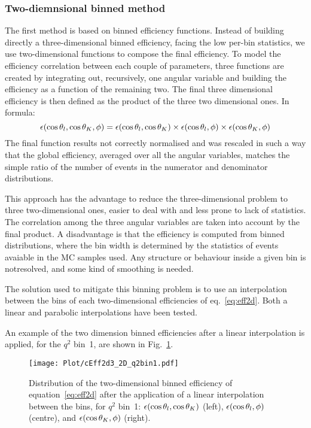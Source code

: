 \subsubsection{Two-diemnsional binned method}\label{sec:eff_2Dprod}
The first method is based on binned efficiency functions.
Instead of building directly a three-dimensional binned efficiency, facing the low per-bin statistics, we use two-dimensional functions to compose the final efficiency.
To model the efficiency correlation between each couple of parameters, three functions are created by integrating out, recursively, one angular variable and building the efficiency as a function of the remaining two.
The final three dimensional efficiency is then defined as the product of the three two dimensional ones.
In formula:
\begin{equation}\label{eq:eff2d}
    \epsilon(\cos\theta_l,\cos\theta_K,\phi)=\epsilon(\cos\theta_l,\cos\theta_K)\times\epsilon(\cos\theta_l,\phi)\times\epsilon(\cos\theta_K,\phi)
\end{equation}
The final function results not correctly normalised and was rescaled in such a way that the global efficiency, averaged over all the angular variables, matches the simple ratio of the number of events in the numerator and denominator distributions.

This approach has the advantage to reduce the three-dimensional problem to three two-dimensional ones, easier to deal with and less prone to lack of statistics.
The correlation among the three angular variables are taken into account by the final product.
A disadvantage is that the efficiency is computed from binned distributions, where the bin width is determined by the statistics of events avaiable in the MC samples used.
Any structure or behaviour inside a given bin is notresolved, and some kind of smoothing is needed.

The solution used to mitigate this binning problem is to use an interpolation between the bins of each two-dimensional efficiencies of eq.~\ref{eq:eff2d}.
Both a linear and parabolic interpolations have been tested.

An example of the two dimension binned efficiencies after a linear interpolation is applied, for the $q^2$ bin~1, are shown in Fig.~\ref{fig:eff2D}.

\begin{figure}[hbt]
    \texttt{[image: Plot/cEff2d3\_2D\_q2bin1.pdf]}
    \caption{Distribution of the two-dimensional binned efficiency of equation~\ref{eq:eff2d} after the application of a linear interpolation between the bins, for $q^2$ bin~1: $\epsilon(\cos\theta_l,\cos\theta_K)$ (left), $\epsilon(\cos\theta_l,\phi)$ (centre), and $\epsilon(\cos\theta_K,\phi)$ (right).}
    \label{fig:eff2D}
\end{figure}

